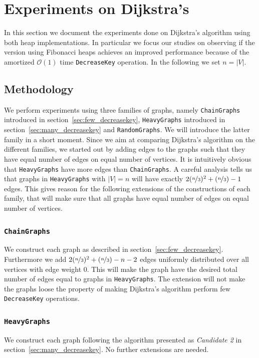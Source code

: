\documentclass[a4paper,oneside,article,11pt]{memoir}
\begin{document}
\chapter{Experiments on Dijkstra's}
\label{cpt:dijksta_experiments}
In this section we document the experiments done on Dijkstra's algorithm using both heap implementations. In particular we focus our studies on observing if the version using Fibonacci heaps achieves an improved performance because of the amortized $\mathcal{O}(1)$ time \texttt{DecreaseKey} operation. In the following we set $n = \lvert V \lvert$.

\section{Methodology}
\label{sec:dijkstra_methology}
We perform experiments using three families of graphs, namely \texttt{ChainGraphs} introduced in section~\ref{sec:few_decreasekey}, \texttt{HeavyGraphs} introduced in section~\ref{sec:many_decreasekey} and \texttt{RandomGraphs}. We will introduce the latter family in a short moment. Since we aim at comparing Dijkstra's algorithm on the different families, we started out by adding edges to the graphs such that they have equal number of edges on equal number of vertices. It is intuitively obvious that \texttt{HeavyGraphs} have more edges than \texttt{ChainGraphs}. A careful analysis tells us that graphs in \texttt{HeavyGraphs} with $\lvert V \rvert = n$ will have exactly $2(\nicefrac{n}{3})^2 + (\nicefrac{n}{3})-1$ edges. This gives reason for the following extensions of the constructions of each family, that will make sure that all graphs have equal number of edges on equal number of vertices.

\subsection{\texttt{ChainGraphs}}
We construct each graph as described in section~\ref{sec:few_decreasekey}. Furthermore we add $2(\nicefrac{n}{3})^2 + (\nicefrac{n}{3})- n - 2$ edges uniformly distributed over all vertices with edge weight $0$. This will make the graph have the desired total number of edges equal to graphs in \texttt{HeavyGraphs}. The extension will not make the graphs loose the property of making Dijkstra's algorithm perform few \texttt{DecreaseKey} operations.

\subsection{\texttt{HeavyGraphs}}
We construct each graph following the algorithm presented as \textit{Candidate 2} in section~\ref{sec:many_decreasekey}. No further extensions are needed.
\end{document}
